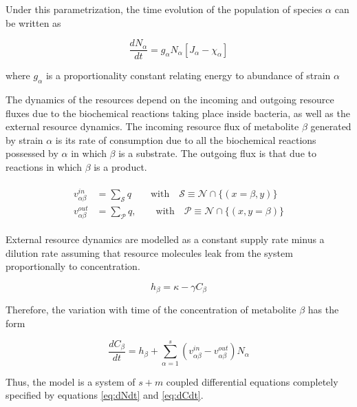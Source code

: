 \documentclass[titlepage,11pt]{article}
\begin{document}
\begin{linenumbers}
				Under this parametrization, the time evolution of the population of species $ \alpha $ can be written as
				\begin{linenomath*}	
					\begin{equation}\label{eq:dNdt}
					\dfrac{dN_{\alpha}}{dt} = g_{\alpha}N_{\alpha}\left[J_{\alpha}-\chi_{\alpha}\right] 
					\end{equation}
				\end{linenomath*}
				where $ g_{\alpha} $ is a proportionality constant relating energy to abundance of strain $ \alpha $ \par 
				The dynamics of the resources depend on the incoming and outgoing resource fluxes due to the biochemical reactions taking place inside bacteria, as well as the external resource dynamics. The incoming resource flux of metabolite $ \beta $  generated by strain $ \alpha $ is its rate of consumption due to all the biochemical reactions possessed by $ \alpha $ in which $ \beta $ is a substrate. The outgoing flux is that due to reactions in which $ \beta $ is a product.
				\begin{linenomath*}	
					\begin{align}
					\begin{split}
					v^{in}_{\alpha \beta} &= \sum_{\mathcal{S}} q   \qquad \textrm{with}  \quad  \mathcal{S} \equiv \mathcal{N} \cap \{(x = \beta, y)\}\\
					v^{out}_{\alpha \beta} &= \sum_{\mathcal{P}} q , \qquad \textrm{with}  \quad  \mathcal{P} \equiv \mathcal{N} \cap \{(x, y = \beta )\}
					\end{split}
					\end{align}
				\end{linenomath*}
				External resource dynamics are modelled as a constant supply rate minus a dilution rate assuming that resource molecules leak from the system proportionally to concentration.  
				\begin{linenomath*}	
					\begin{equation}
					h_{\beta}  =  \kappa - \gamma C_{\beta}
					\end{equation}
				\end{linenomath*}
				Therefore, the variation with time of the concentration of metabolite $ \beta $ has the form
				\begin{linenomath*}	
					\begin{equation}
					\dfrac{dC_{\beta}}{dt} = h_{\beta} + \sum_{{\alpha} = 1}^{s} \left(v_{{\alpha}\beta}^{in} -v_{{\alpha}\beta}^{out} \right)N_{\alpha} \label{eq:dCdt}
					\end{equation}
				\end{linenomath*}
				Thus, the model is a system of $ s + m $ coupled differential equations completely specified by equations \ref{eq:dNdt} and \ref{eq:dCdt}.

\end{linenumbers}
\end{document}
